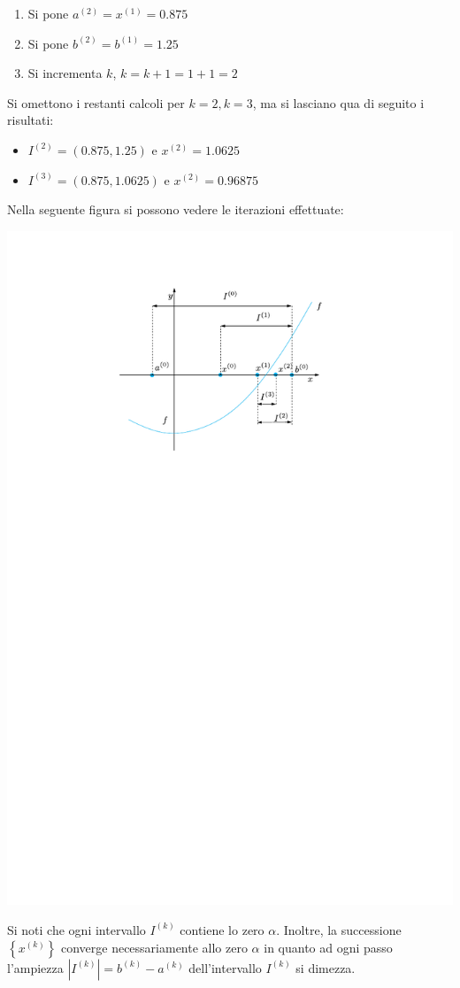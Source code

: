 \begin{examplebox}
\begin{enumerate}
\begin{enumerate}
            \item Si pone $a^{(2)} = x^{(1)} = 0.875$

            \item Si pone $b^{(2)} = b^{(1)} = 1.25$

            \item Si incrementa $k$, $k = k + 1 = 1 + 1 = 2$
        \end{enumerate}
    \end{enumerate}
    Si omettono i restanti calcoli per $k=2, k=3$, ma si lasciano qua di seguito i risultati:
    \begin{itemize}
        \item $I^{(2)} = \left(0.875, 1.25\right)$ e $x^{(2)} = 1.0625$
        \item $I^{(3)} = \left(0.875, 1.0625\right)$ e $x^{(2)} = 0.96875$
    \end{itemize}

    \newpage

    \noindent
    Nella seguente figura si possono vedere le iterazioni effettuate:
    \begin{center}
        \includegraphics[width=.7\textwidth]{img/metodo-di-bisezione-1.pdf}
    \end{center}
    
    \noindent
    Si noti che ogni intervallo $I^{(k)}$ contiene lo zero $\alpha$. Inoltre, la successione $\left\{x^{(k)}\right\}$ converge necessariamente allo zero $\alpha$ in quanto ad ogni passo l'ampiezza $\left| I^{(k)} \right| = b^{(k)} - a^{(k)}$ dell'intervallo $I^{(k)}$ si dimezza.
\end{examplebox}

